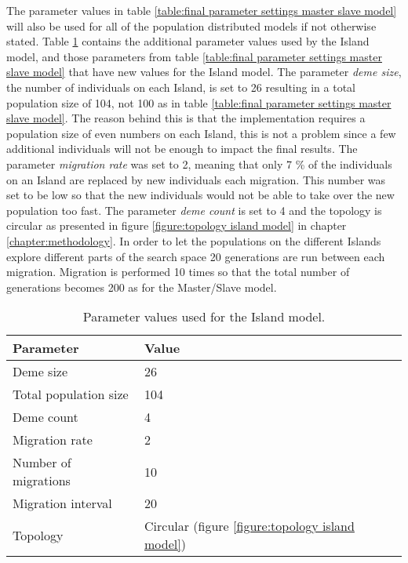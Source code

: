 \noindent The parameter values in table \ref{table:final parameter settings master slave model} will also be used for all of the population distributed models if not otherwise stated. Table \ref{table:final parameter settings island model} contains the additional parameter values used by the Island model, and those parameters from table \ref{table:final parameter settings master slave model} that have new values for the Island model. The parameter \textit{deme size}, the number of individuals on each Island, is set to 26 resulting in a total population size of 104, not 100 as in table \ref{table:final parameter settings master slave model}. The reason behind this is that the implementation requires a population size of even numbers on each Island, this is not a problem since a few additional individuals will not be enough to impact the final results. The parameter \textit{migration rate} was set to 2, meaning that only 7 \% of the individuals on an Island are replaced by new individuals each migration. This number was set to be low so that the new individuals would not be able to take over the new population too fast. The parameter \textit{deme count} is set to 4 and the topology is circular as presented in figure \ref{figure:topology island model} in chapter \ref{chapter:methodology}. In order to let the populations on the different Islands explore different parts of the search space 20 generations are run between each migration. Migration is performed 10 times so that the total number of generations becomes 200 as for the Master/Slave model.\\

\begin{table}[h!]
\centering
\caption{Parameter values used for the Island model.}
\label{table:final parameter settings island model}
\begin{tabular}{l|l}
\textbf{Parameter} & \textbf{Value} \\ 
\hline 
Deme size & 26 \\
Total population size & 104 \\  
Deme count & 4 \\
Migration rate & 2 \\
Number of migrations & 10 \\ 
Migration interval & 20 \\
Topology & Circular (figure \ref{figure:topology island model}) \\
\end{tabular}
\end{table}

